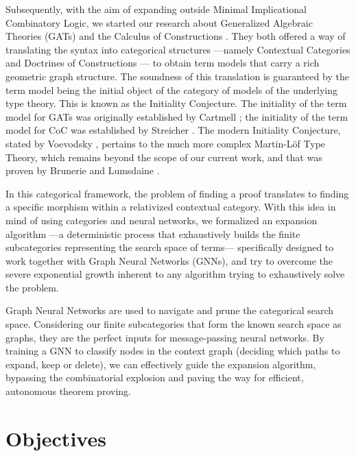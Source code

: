 Subsequently, with the aim of expanding outside Minimal Implicational Combinatory Logic, we 
started our research about Generalized Algebraic Theories (GATs) \cite{cartmell1978,cartmell1986} and the Calculus of Constructions \cite{coquand1988}.
They both offered a way of translating the syntax into categorical structures 
---namely Contextual Categories and Doctrines of Constructions \cite{streicher}--- 
to obtain term models that carry a rich geometric graph structure. 
The soundness of this translation is guaranteed by the term 
model being the initial object of the category of models of 
the underlying type theory. This is known as the Initiality Conjecture. 
The initiality of the term model for GATs was originally established by Cartmell \cite{cartmell1978,cartmell1986};
the initiality of the term model for CoC was established by Streicher \cite{streicher}.
The modern Initiality Conjecture, stated by Voevodsky \cite{voevodsky2017}, pertains to the much more complex Martin-L\"of Type Theory, 
which remains beyond the scope of our current work, and that was proven by Brunerie and Lumsdaine \cite{bruneire2020}.

In this categorical framework, the problem of finding a proof
translates to finding a specific morphism
within a relativized contextual category. 
With this idea in mind of using categories and neural networks, we formalized 
an expansion algorithm 
---a deterministic process that exhaustively builds the finite subcategories
representing the search space of terms--- specifically designed to work together
with Graph Neural Networks (GNNs), and try to overcome the severe exponential growth
inherent to any algorithm trying to exhaustively solve the problem.

Graph Neural Networks are used to navigate and prune the categorical search space. 
Considering our finite subcategories that form
the known search space as graphs, they are the perfect inputs 
for message-passing neural networks. By training a GNN to classify
nodes in the context graph (deciding which paths to expand, keep
or delete), we can effectively guide the expansion algorithm,
bypassing the combinatorial explosion and paving the way for efficient,
autonomous theorem proving.

\section*{Objectives}

